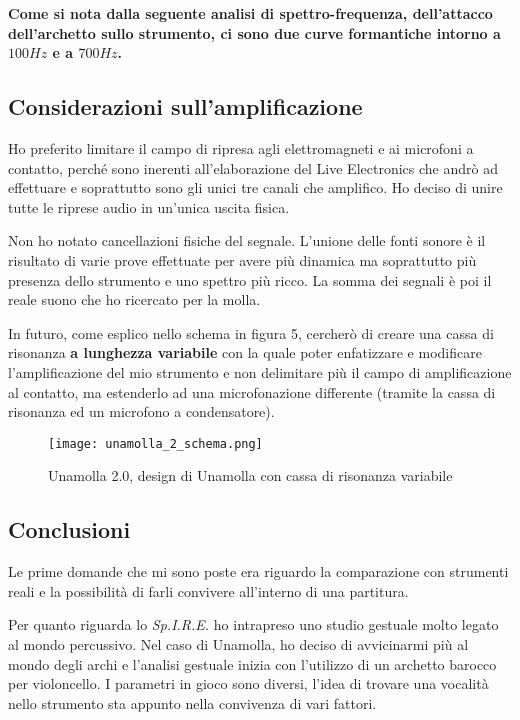 \textbf{Come si nota dalla seguente analisi di spettro-frequenza, dell’attacco
dell’archetto sullo strumento, ci sono due curve formantiche intorno a $100Hz$ e
a $700Hz$.}

\subsection{Considerazioni sull’amplificazione}

Ho preferito limitare il campo di ripresa agli elettromagneti e ai microfoni a
contatto, perché sono inerenti all’elaborazione del Live Electronics che andrò
ad effettuare e soprattutto sono gli unici tre canali che amplifico. Ho deciso
di unire tutte le riprese audio in un’unica uscita fisica.

Non ho notato cancellazioni fisiche del segnale. L’unione delle fonti sonore
è il risultato di varie prove effettuate per avere più dinamica ma soprattutto
più presenza dello strumento e uno spettro più ricco. La somma dei segnali è
poi il reale suono che ho ricercato per la molla.

In futuro, come esplico nello schema in figura 5, cercherò di creare una cassa
di risonanza \textbf{a lunghezza variabile} con la quale poter enfatizzare e
modificare l’amplificazione del mio strumento e non delimitare più il campo di
amplificazione al contatto, ma estenderlo ad una microfonazione differente
(tramite la cassa di risonanza ed un microfono a condensatore).

\begin{figure}[h]
\centering
\texttt{[image: unamolla\_2\_schema.png]}
\caption{Unamolla 2.0, design di Unamolla con cassa di risonanza variabile}
\label{fig:05_unamolla_2.0}
\end{figure}

\subsection{Conclusioni}

Le prime domande che mi sono poste era riguardo la comparazione con strumenti
reali e la possibilità di farli convivere all’interno di una partitura.

Per quanto riguarda lo \emph{Sp.I.R.E.} ho intrapreso uno studio gestuale molto legato
al mondo percussivo. Nel caso di Unamolla, ho deciso di avvicinarmi più al mondo
degli archi e l’analisi gestuale inizia con l’utilizzo di un archetto barocco
per violoncello. I parametri in gioco sono diversi, l’idea di trovare una
vocalità nello strumento sta appunto nella convivenza di vari fattori.

